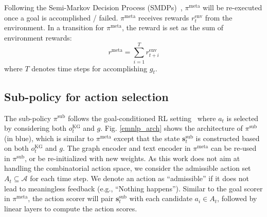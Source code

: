 \documentclass[11pt]{article}
\begin{document}
Following the Semi-Markov Decision Process (SMDPs)~\cite{sutton1999hrl}, $\pi^{\text{meta}}$ will be re-executed once a goal is accomplished / failed. $\pi^{\text{meta}}$ receives rewards $r_t^{\text{env}}$ from the environment. 
In a transition for $\pi^{\text{meta}}$, the reward is set as the sum of environment rewards:
\begin{equation}
    r^{\text{meta}} = \sum_{i=1}^T r^{\text{env}}_{t+i}
\end{equation}
where $T$ denotes time steps for accomplishing $g_t$. 

\subsection{Sub-policy for action selection \label{section_method_part2}}

The sub-policy $\pi^{\text{sub}}$ follows the goal-conditioned RL setting~\cite{kaelbling1993goal} where $a_t$ is selected by considering both $o_t^{\text{KG}}$ and $g$.
Fig. \ref{emnlp_arch} shows the architecture of $\pi^{\text{sub}}$ (in blue), which is similar to $\pi^{\text{meta}}$ except that the state $\bm{s}_t^{\text{sub}}$ is constructed based on both $o_t^{\text{KG}}$ and $g$. 
The graph encoder and text encoder in $\pi^{\text{meta}}$ can be re-used in $\pi^{\text{sub}}$, or be re-initialized with new weights. 
As this work does not aim at handling the combinatorial action space, we consider the admissible action set $A_t \subseteq \mathcal{A}$ for each time step. We denote an action as ``admissible'' if it does not lead to meaningless feedback (e.g., ``Nothing happens'').
Similar to the goal scorer in $\pi^{\text{meta}}$,  the action scorer will pair  $\bm{s}_t^{\text{sub}}$ with each candidate $a_i \in A_t$, followed by linear layers to compute the action scores. 
\end{document}
